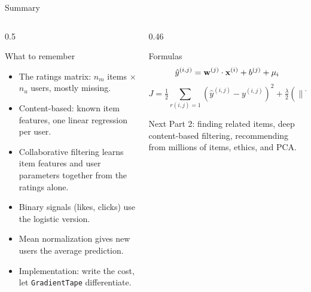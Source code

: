 \documentclass[aspectratio=169,10pt]{beamer}
\begin{document}
\begin{frame}{Summary}
  \begin{columns}[T,onlytextwidth]
    \begin{column}{0.5\textwidth}
      \begin{block}{What to remember}
        \footnotesize
        \begin{itemize}
          \item The ratings matrix: $n_m$ items $\times$ $n_u$ users, mostly missing.
          \item Content-based: known item features, one linear regression per user.
          \item Collaborative filtering learns item features and user parameters
                together from the ratings alone.
          \item Binary signals (likes, clicks) use the logistic version.
          \item Mean normalization gives new users the average prediction.
          \item Implementation: write the cost, let \texttt{GradientTape} differentiate.
        \end{itemize}
      \end{block}
    \end{column}
    \begin{column}{0.46\textwidth}
      \begin{block}{Formulas}
        \[ \hat y^{(i,j)} = \mathbf{w}^{(j)}\cdot\mathbf{x}^{(i)} + b^{(j)} + \mu_i \]
        \[ J = \tfrac12\!\!\sum_{r(i,j)=1}\!\!(\hat y^{(i,j)} - y^{(i,j)})^2
               + \tfrac{\lambda}{2}(\|\mathbf W\|^2 + \|\mathbf X\|^2) \]
      \end{block}
      \begin{block}{Next}
        \footnotesize Part 2: finding related items, deep content-based filtering,
        recommending from millions of items, ethics, and PCA.
      \end{block}
    \end{column}
  \end{columns}
\end{frame}
\end{document}
